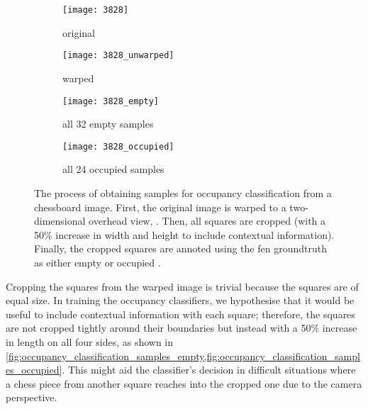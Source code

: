 \documentclass[../main.tex]{subfiles}
\begin{document}
\begin{figure}
    \centering
    \begin{subfigure}[b]{0.47\textwidth}
        \centering
        \texttt{[image: 3828]}
        \caption{original}
        \label{fig:occupancy_classification_samples_original}
    \end{subfigure}
    \hfill
    \begin{subfigure}[b]{0.47\textwidth}
        \centering
        \texttt{[image: 3828\_unwarped]}
        \caption{warped}
        \label{fig:occupancy_classification_samples_warped}
    \end{subfigure}
    
    \bigskip
    \begin{subfigure}[b]{0.47\textwidth}
        \centering
        \texttt{[image: 3828\_empty]}
        \caption{all 32 empty samples}
        \label{fig:occupancy_classification_samples_empty}
    \end{subfigure}
    \hfill
    \begin{subfigure}[b]{0.47\textwidth}
        \centering
        \texttt{[image: 3828\_occupied]}
        \caption{all 24 occupied samples}
        \label{fig:occupancy_classification_samples_occupied}
    \end{subfigure}
    \caption[The process of obtaining samples for occupancy classification from a chessboard image.]{The process of obtaining samples for occupancy classification from a chessboard image. First, the original image  is warped to a two-dimensional overhead view, . Then, all squares are cropped (with a 50\% increase in width and height to include contextual information). Finally, the cropped squares are annoted using the \gls{fen} groundtruth as either empty  or occupied .}
    \label{fig:occupancy_classification_samples}
\end{figure}

Cropping the squares from the warped image is trivial because the squares are of equal size.
In training the occupancy classifiers, we hypothesise that it would be useful to include contextual information with each square; therefore, the squares are not cropped tightly around their boundaries but instead with a 50\% increase in length on all four sides, as shown in \cref{fig:occupancy_classification_samples_empty,fig:occupancy_classification_samples_occupied}.
This might aid the classifier's decision in difficult situations where a chess piece from another square reaches into the cropped one due to the camera perspective.
\end{document}
